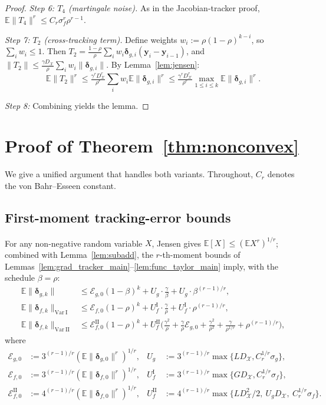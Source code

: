 \documentclass{article}
\newcommand{\cX}{\mathcal{X}}
\def\vy{{\bm{y}}}
\newcommand{\E}{\mathbb{E}}
\begin{document}
\begin{proof}
\emph{Step 6: $T_4$ (martingale noise).} As in the Jacobian-tracker proof, $\E\|T_4\|^r \le C_r \sigma_f^r \rho^{r-1}$.

\emph{Step 7: $T_2$ (cross-tracking term).} Define weights $w_i := \rho(1-\rho)^{k-i}$, so $\sum_i w_i \le 1$. Then $T_2 = \tfrac{1-\rho}{\rho}\sum_i w_i \bm\delta_{g,i}(\vy_i - \vy_{i-1})$, and $\|T_2\| \le \tfrac{\gamma D_\cX}{\rho}\sum_i w_i \|\bm\delta_{g,i}\|$. By Lemma~\ref{lem:jensen}:
\[
\E\|T_2\|^r \le \tfrac{\gamma^r D_\cX^r}{\rho^r} \sum_i w_i \E\|\bm\delta_{g,i}\|^r \le \tfrac{\gamma^r D_\cX^r}{\rho^r} \max_{1 \le i \le k} \E\|\bm\delta_{g,i}\|^r.
\]

\emph{Step 8:} Combining yields the lemma.
\end{proof}

\section{Proof of Theorem~\ref{thm:nonconvex}} \label{sec:proof_nonconvex}

We give a unified argument that handles both variants. Throughout, $C_r$ denotes the von Bahr--Esseen constant.

\subsection{First-moment tracking-error bounds}

For any non-negative random variable $X$, Jensen gives $\E[X] \le (\E X^r)^{1/r}$; combined with Lemma~\ref{lem:subadd}, the $r$-th-moment bounds of Lemmas~\ref{lem:grad_tracker_main}--\ref{lem:func_taylor_main} imply, with the schedule $\beta = \rho$:
\begin{align}
\E\|\bm\delta_{g,k}\| &\le \mathcal{E}_{g,0}(1-\beta)^k + U_g \cdot \tfrac{\gamma}{\beta} + U_g \cdot \beta^{(r-1)/r}, \label{eq:grad_first_simplified} \\
\E\|\bm\delta_{f,k}\|_{\mathrm{Var\ I}} &\le \mathcal{E}_{f,0}(1-\rho)^k + U_f^{\mathrm{I}} \cdot \tfrac{\gamma}{\rho} + U_f^{\mathrm{I}} \cdot \rho^{(r-1)/r}, \label{eq:func_polyak_first} \\
\E\|\bm\delta_{f,k}\|_{\mathrm{Var\ II}} &\le \mathcal{E}_{f,0}^{\mathrm{II}}(1-\rho)^k + U_f^{\mathrm{II}}\Big(\tfrac{\gamma^2}{\rho} + \tfrac{\gamma}{\rho}\mathcal{E}_{g,0} + \tfrac{\gamma^2}{\rho^2} + \tfrac{\gamma}{\rho^{1/r}} + \rho^{(r-1)/r}\Big), \label{eq:func_taylor_first}
\end{align}
where
\begin{align*}
\mathcal{E}_{g,0} &:= 3^{(r-1)/r}(\E\|\bm\delta_{g,0}\|^r)^{1/r}, &
U_g &:= 3^{(r-1)/r}\max\{LD_\cX, C_r^{1/r}\sigma_g\}, \\
\mathcal{E}_{f,0} &:= 3^{(r-1)/r}(\E\|\bm\delta_{f,0}\|^r)^{1/r}, &
U_f^{\mathrm{I}} &:= 3^{(r-1)/r}\max\{GD_\cX, C_r^{1/r}\sigma_f\}, \\
\mathcal{E}_{f,0}^{\mathrm{II}} &:= 4^{(r-1)/r}(\E\|\bm\delta_{f,0}\|^r)^{1/r}, &
U_f^{\mathrm{II}} &:= 4^{(r-1)/r}\max\{LD_\cX^2/2,\ U_g D_\cX,\ C_r^{1/r}\sigma_f\}.
\end{align*}
\end{document}
